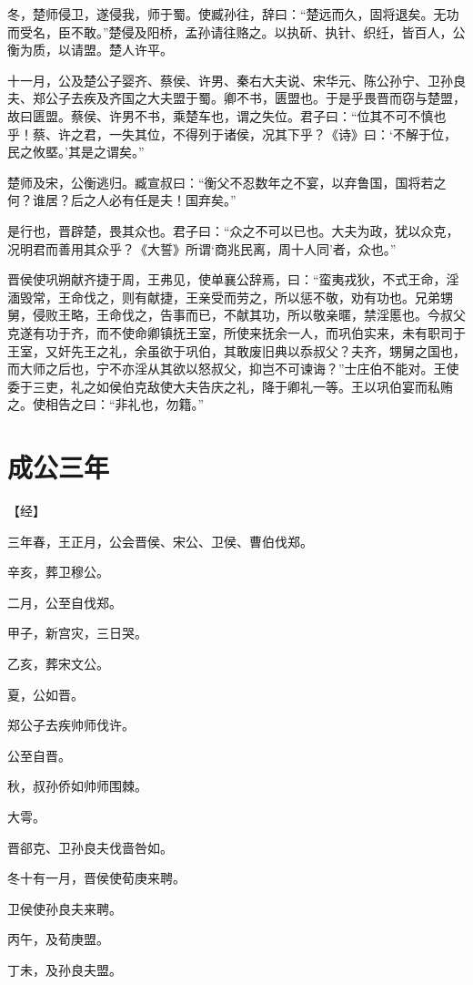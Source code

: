 \documentclass[a4paper,12pt,UTF8,twoside]{ctexbook}
\begin{document}
冬，楚师侵卫，遂侵我，师于蜀。使臧孙往，辞曰：“楚远而久，固将退矣。无功而受名，臣不敢。”楚侵及阳桥，孟孙请往赂之。以执斫、执针、织纴，皆百人，公衡为质，以请盟。楚人许平。

十一月，公及楚公子婴齐、蔡侯、许男、秦右大夫说、宋华元、陈公孙宁、卫孙良夫、郑公子去疾及齐国之大夫盟于蜀。卿不书，匮盟也。于是乎畏晋而窃与楚盟，故曰匮盟。蔡侯、许男不书，乘楚车也，谓之失位。君子曰：“位其不可不慎也乎！蔡、许之君，一失其位，不得列于诸侯，况其下乎？《诗》曰：‘不解于位，民之攸塈。’其是之谓矣。”

楚师及宋，公衡逃归。臧宣叔曰：“衡父不忍数年之不宴，以弃鲁国，国将若之何？谁居？后之人必有任是夫！国弃矣。”

是行也，晋辟楚，畏其众也。君子曰：“众之不可以已也。大夫为政，犹以众克，况明君而善用其众乎？《大誓》所谓‘商兆民离，周十人同’者，众也。”

晋侯使巩朔献齐捷于周，王弗见，使单襄公辞焉，曰：“蛮夷戎狄，不式王命，淫湎毁常，王命伐之，则有献捷，王亲受而劳之，所以惩不敬，劝有功也。兄弟甥舅，侵败王略，王命伐之，告事而已，不献其功，所以敬亲暱，禁淫慝也。今叔父克遂有功于齐，而不使命卿镇抚王室，所使来抚余一人，而巩伯实来，未有职司于王室，又奸先王之礼，余虽欲于巩伯，其敢废旧典以忝叔父？夫齐，甥舅之国也，而大师之后也，宁不亦淫从其欲以怒叔父，抑岂不可谏诲？”士庄伯不能对。王使委于三吏，礼之如侯伯克敌使大夫告庆之礼，降于卿礼一等。王以巩伯宴而私贿之。使相告之曰：“非礼也，勿籍。”


\chapter{成公三年}

【经】

三年春，王正月，公会晋侯、宋公、卫侯、曹伯伐郑。

辛亥，葬卫穆公。

二月，公至自伐郑。

甲子，新宫灾，三日哭。

乙亥，葬宋文公。

夏，公如晋。

郑公子去疾帅师伐许。

公至自晋。

秋，叔孙侨如帅师围棘。

大雩。

晋郤克、卫孙良夫伐啬咎如。

冬十有一月，晋侯使荀庚来聘。

卫侯使孙良夫来聘。

丙午，及荀庚盟。

丁未，及孙良夫盟。
\end{document}
